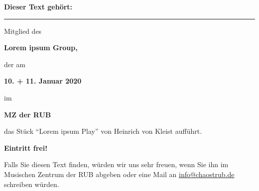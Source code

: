 \documentclass[10pt]{article}
\newcommand{\PlayTitle}{Lorem ipsum Play}
\newcommand{\GroupName}{Lorem ipsum Group}
\newcommand{\TitlePageLine}[3]{\fontsize{#1}{#2}\selectfont #3 \par}
\newcommand{\TitlePageLineBold}[3]{\fontsize{#1}{#2}\selectfont \textbf{#3} \par}
\begin{document}
\begin{titlepage}
\begin{center}
\TitlePageLineBold{18pt}{18pt}{Dieser Text gehört:} 
\vspace{1.25cm}
\textcolor{SignatureLineColor}{\rule{1\textwidth}{0.8pt}}

\TitlePageLine{18pt}{18pt}{Mitglied des} 
\TitlePageLineBold{36pt}{36pt}{\GroupName,}
\TitlePageLine{18pt}{18pt}{der am} 
\TitlePageLineBold{36pt}{36pt}{10. + 11. Januar 2020}
\TitlePageLine{18pt}{18pt}{im} 
\TitlePageLineBold{36pt}{36pt}{MZ der RUB}
\TitlePageLine{24pt}{36pt}{das Stück “\PlayTitle” von Heinrich von Kleist aufführt.}
\TitlePageLineBold{36pt}{36pt}{Eintritt frei!}
\vspace{2.5cm}
\TitlePageLine{18pt}{27pt}{Falls Sie diesen Text finden, würden wir uns sehr freuen, wenn Sie ihn im Musischen Zentrum der RUB abgeben \mbox{} oder eine Mail an \setuldepth{info}\href{mailto:info@chaostrub.de}{\ul{info@chaostrub.de}} schreiben würden.}
\end{center}
\end{titlepage}
\end{document}
